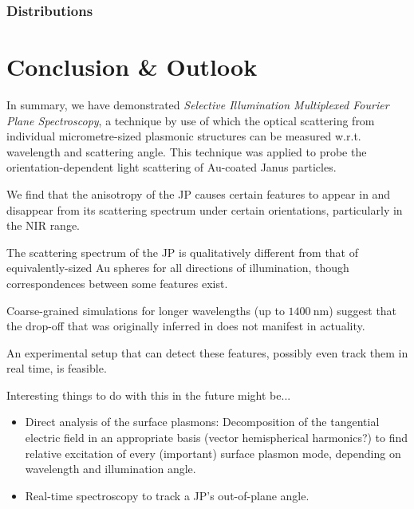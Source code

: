 \documentclass[10pt]{article}
\begin{document}

\subsubsection*{Distributions} 











\section*{Conclusion \& Outlook}


In summary, we have demonstrated \emph{Selective Illumination Multiplexed Fourier Plane Spectroscopy}, a technique by use of which the optical scattering from individual micrometre-sized plasmonic structures can be measured w.r.t. wavelength and scattering angle. 
This technique was applied to probe the orientation-dependent light scattering of Au-coated Janus particles.  

We find that the anisotropy of the JP causes certain features to appear in and disappear from its scattering spectrum under certain orientations, particularly in the NIR range. 

The scattering spectrum of the JP is qualitatively different from that of equivalently-sized Au spheres for all directions of illumination, though correspondences between some features exist.   

Coarse-grained simulations for longer wavelengths (up to $\SI{1400}{\nano\meter}$) suggest that the drop-off that was originally inferred in \cite*{MA} does not manifest in actuality. 

An experimental setup that can detect these features, possibly even track them in real time, is feasible.

Interesting things to do with this in the future might be...
\begin{itemize}
    \item Direct analysis of the surface plasmons: 
    Decomposition of the tangential electric field in an appropriate basis (vector hemispherical harmonics?) to find relative excitation of every (important) surface plasmon mode, depending on wavelength and illumination angle.
    \item Real-time spectroscopy to track a JP's out-of-plane angle. 
\end{itemize}
\end{document}
